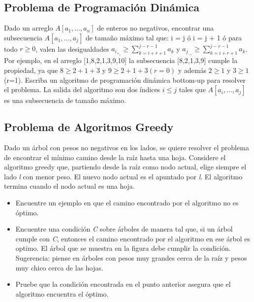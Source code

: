 \documentclass[10pt]{article}
\begin{document}
\subsection*{Problema de Programaci\'on Din\'amica}
Dado un arreglo $A[a_1,...,a_n]$ de enteros no negativos, encontrar una subsecuencia $A[a_1,...,a_j]$ de tama\~no m\'aximo tal que: i = j  \'o  i = j + 1 \'o para todo $r \geq 0$, valen las desigualdades $a_i_+_r \geq \sum_{k=i+r+1}^{j-r-1}a_k $ y $ a_j_-_r \geq \sum_{k=i+r+1}^{j-r-1}a_k$.
Por ejemplo, en el arreglo [1,8,2,1,3,9,10] la subsecuencia [8,2,1,3,9] cumple la propiedad, ya que $ 8 \geq 2 + 1 + 3 $ y $ 9 \geq 2 + 1 + 3 (r=0) $ y adem\'as $ 2 \geq 1 $ y $ 3 \geq 1 $ (r=1).
Escriba un algoritmo de programaci\'on din\'amica bottom-up para resolver el problema. La salida del algoritmo son dos \'indices $ i \leq j $ tales que $A[a_i,...,a_j]$ es una subsecuencia de tama\~no m\'aximo.
\subsection*{Problema de Algoritmos Greedy}
Dado un  \'arbol con pesos no negativos en los lados, se quiere resolver el problema de encontrar el m\'inimo camino desde la ra\'iz hasta una hoja. Considere el algoritmo greedy que, partiendo desde la ra\'iz como nodo actual, elige siempre el lado \textit{l} con menor peso. El nuevo nodo actual es
el apuntado por \textit{l}. El algoritmo termina cuando el nodo actual es una hoja.
\begin{itemize}
    \item Encuentre un ejemplo en que el camino encontrado por el algoritmo no es \'optimo.
    \item Encuentre una condici\'on \textit{C} sobre \'arboles de manera tal que, si un \'arbol cumple con \textit{C}, entonces el camino encontrado por el algoritmo en ese \'arbol es optimo. El \'arbol que se muestra en la figura debe cumplir la condici\'on. Sugerencia: piense en \'arboles con pesos muy grandes cerca de la ra\'iz y pesos muy chico cerca de las hojas.
    \item Pruebe que la condici\'on encontrada en el punto anterior asegura que el algoritmo encuentra el \'optimo.
\end{itemize}
\end{document}
